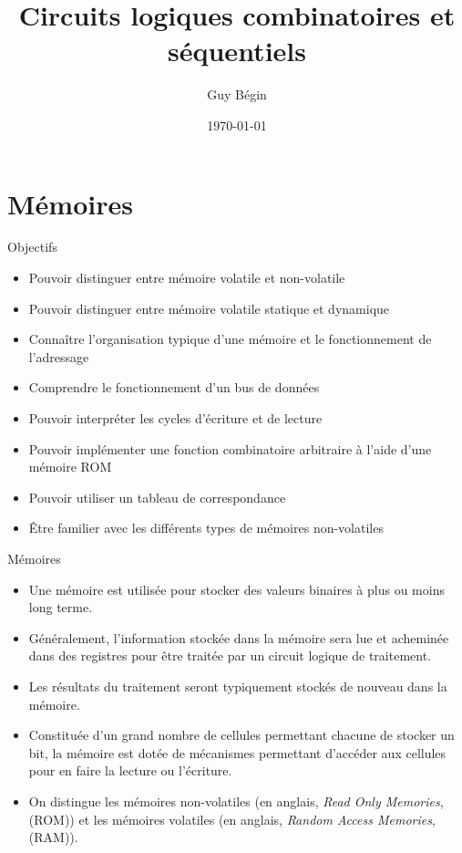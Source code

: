 \documentclass[presentation]{beamer}
\author{Guy Bégin}
\date{\today}
\title{Circuits logiques combinatoires et séquentiels}
\begin{document}
\maketitle

\section{Mémoires}
\label{sec:org4eadd9a}
\begin{frame}[label={sec:orgbf66310}]{Objectifs}
\begin{itemize}
\item Pouvoir distinguer entre mémoire volatile et non-volatile
\item Pouvoir distinguer entre mémoire volatile statique et dynamique
\item Connaître l'organisation typique d'une mémoire et le fonctionnement
de l'adressage
\item Comprendre le fonctionnement d'un bus de données
\item Pouvoir interpréter les cycles d'écriture et de lecture
\item Pouvoir implémenter une fonction combinatoire arbitraire à l'aide d'une
mémoire ROM
\item Pouvoir utiliser un tableau de correspondance
\item Être familier avec les différents types de mémoires non-volatiles
\end{itemize}
\end{frame}

\begin{frame}[label={sec:orga0b55d3}]{Mémoires}
\begin{itemize}
\item Une mémoire est utilisée pour stocker des valeurs binaires à plus ou moins long terme.

\item Généralement, l'information stockée dans la mémoire sera lue et acheminée dans des registres pour être traitée par un circuit logique de traitement.

\item Les résultats du traitement seront typiquement stockés de nouveau dans la mémoire.

\item Constituée d'un grand nombre de cellules permettant chacune de stocker un bit, la mémoire est dotée de mécanismes permettant d'accéder aux cellules pour en faire la lecture ou l'écriture.

\item On distingue les mémoires non-volatiles (en anglais, \emph{Read Only Memories}, (ROM)) et les mémoires volatiles (en anglais, \emph{Random Access Memories}, (RAM)).
\end{itemize}
\end{frame}
\end{document}
